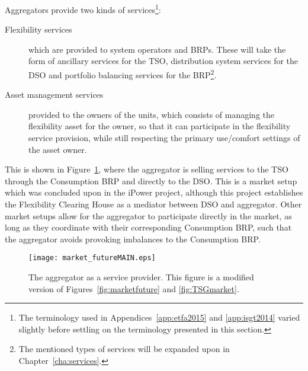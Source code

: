Aggregators provide two kinds of services\footnote{The terminology used in Appendices~\ref{app:etfa2015} and \ref{app:isgt2014} varied slightly before settling on the terminology presented in this section.}:
\begin{description}
	\item[Flexibility services] which are provided to system operators and BRPs. These will take the form of ancillary services for the TSO, distribution system services for the DSO and portfolio balancing services for the BRP\footnote{The mentioned types of services will be expanded upon in Chapter~\ref{cha:services}.}.
	\item[Asset management services] provided to the owners of the units, which consists of managing the flexibility asset for the owner, so that it can participate in the flexibility service provision, while still respecting the primary use/comfort settings of the asset owner.
\end{description}
This is shown in Figure~\ref{fig:market_futureMAIN}, where the aggregator is selling services to the TSO through the Consumption BRP and directly to the DSO. This is a market setup which was concluded upon in the iPower project, although this project establishes the Flexibility Clearing House as a mediator between DSO and aggregator. Other market setups allow for the aggregator to participate directly in the market, as long as they coordinate with their corresponding Consumption BRP, such that the aggregator avoids provoking imbalances to the Consumption BRP.
\begin{figure}[htbp!]
\centering
\texttt{[image: market\_futureMAIN.eps]}
\caption{The aggregator as a service provider. This figure is a modified version of Figures~\ref{fig:marketfuture} and \ref{fig:TSGmarket}.}
\label{fig:market_futureMAIN}
\end{figure}


